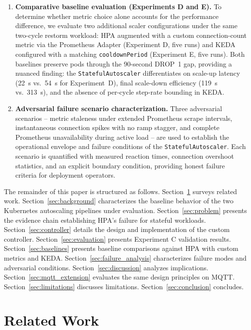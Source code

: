 \documentclass[twocolumn]{svjour3}
\begin{document}
\begin{enumerate}[leftmargin=*]
\item \textbf{Comparative baseline evaluation (Experiments D and E).} To determine whether metric choice alone accounts for the performance difference, we evaluate two additional scaler configurations under the same two-cycle restorm workload: HPA augmented with a custom connection-count metric via the Prometheus Adapter (Experiment D, five runs) and KEDA configured with a matching \texttt{cooldownPeriod} (Experiment E, five runs). Both baselines preserve pods through the 90-second DROP~1 gap, providing a nuanced finding: the \texttt{StatefulAutoscaler} differentiates on scale-up latency (22~s vs.\ 54~s for Experiment~D), final scale-down efficiency (119~s vs.\ 313~s), and the absence of per-cycle step-rate bounding in KEDA.

\item \textbf{Adversarial failure scenario characterization.} Three adversarial scenarios -- metric staleness under extended Prometheus scrape intervals, instantaneous connection spikes with no ramp stagger, and complete Prometheus unavailability during active load -- are used to establish the operational envelope and failure conditions of the \texttt{StatefulAutoscaler}. Each scenario is quantified with measured reaction times, connection overshoot statistics, and an explicit boundary condition, providing honest failure criteria for deployment operators.
\end{enumerate}

The remainder of this paper is structured as follows. Section~\ref{sec:related} surveys related work. Section~\ref{sec:background} characterizes the baseline behavior of the two Kubernetes autoscaling pipelines under evaluation. Section~\ref{sec:problem} presents the evidence chain establishing HPA's failure for stateful workloads. Section~\ref{sec:controller} details the design and implementation of the custom controller. Section~\ref{sec:evaluation} presents Experiment C validation results. Section~\ref{sec:baselines} presents baseline comparisons against HPA with custom metrics and KEDA. Section~\ref{sec:failure_analysis} characterizes failure modes and adversarial conditions. Section~\ref{sec:discussion} analyzes implications. Section~\ref{sec:mqtt_extension} evaluates the same design principles on MQTT. Section~\ref{sec:limitations} discusses limitations. Section~\ref{sec:conclusion} concludes.


\section{Related Work}
\label{sec:related}
\end{document}
